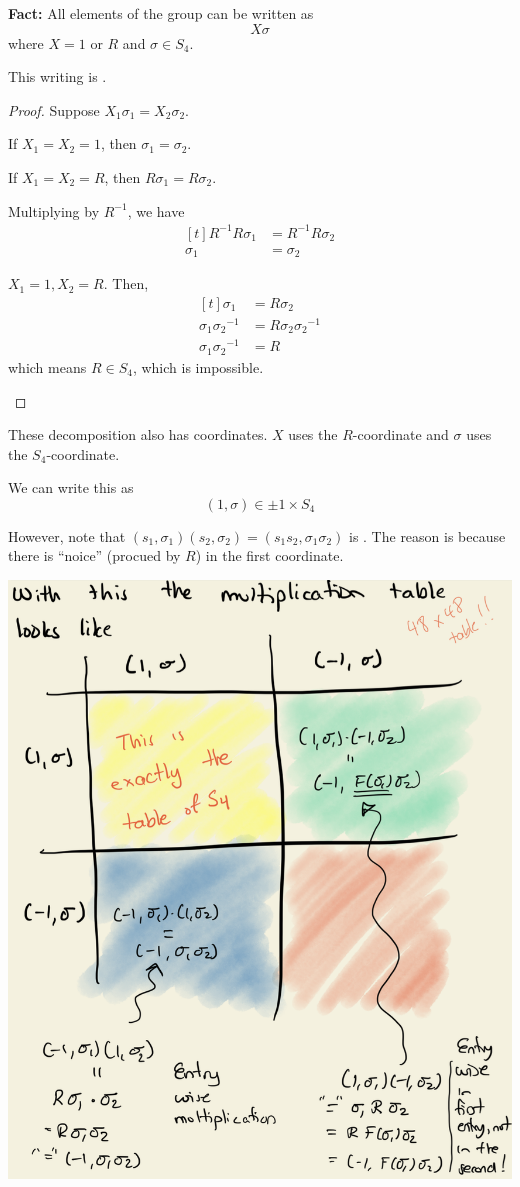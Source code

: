\textbf{Fact:} All elements of the group can be written as \[
    X \sigma
\] where $X = 1 \text{ or } R$ and $\sigma \in S_4$. 

\begin{proposition}
    This writing is . 
\end{proposition}

\begin{proof}
    Suppose $X_1 \sigma_1 = X_2 \sigma_2$. 

    \begin{listu}
        \item If $X_1 = X_2 = 1$, then $\sigma_1 = \sigma_2$.

        \item If $X_1 = X_2 = R$, then $R \sigma_1 = R \sigma_2$.

        Multiplying by $R^{-1}$, we have \[ \begin{aligned}[t]
            R^{-1} R \sigma_1 & = R^{-1} R \sigma_2 \\
            \sigma_1          & = \sigma_2
        \end{aligned} \]

        \item $X_1 = 1, X_2 = R$. Then, \[ \begin{aligned}[t]
            \sigma_1 & = R \sigma_2 \\
            \sigma_1 {\sigma_2}^{-1} & = R \sigma_2 {\sigma_2}^{-1} \\
            \sigma_1 {\sigma_2}^{-1} & = R
        \end{aligned} \] which means $R \in S_4$, which is impossible.
    \end{listu}
\end{proof}

These decomposition also has coordinates. $X$ uses the $R$-coordinate and $\sigma$ uses the $S_4$-coordinate.

We can write this as \[
    (1, \sigma) \in \pm 1 \times S_4
\]

However, note that $(s_1, \sigma_1) (s_2, \sigma_2) = (s_1 s_2, \sigma_1 \sigma_2)$ is . The reason is because there is ``noice'' (procued by $R$) in the first coordinate.

\begin{center}
    \includegraphics[width=0.67\linewidth]{figures/rotation_s4_table.png}
\end{center}